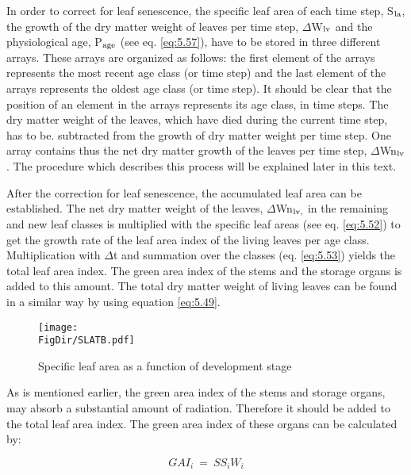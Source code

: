 In order to correct for leaf senescence, the specific leaf area of each time step, S$_{{\rm la}}$, the
growth of the dry matter weight of leaves per time step, $\Delta$W$_{{\rm lv}}$ and the physiological age,
P$_{{\rm age}}$ (see eq. \ref{eq:5.57}), have to be stored in three different arrays. These arrays are organized
as follows: the first element of the arrays represents the most recent age class (or time
step) and the last element of the arrays represents the oldest age class (or time step). It
should be clear that the position of an element in the arrays represents its age class, in
time steps. The dry matter weight of the leaves, which have died during the current time
step, has to be. subtracted from the growth of dry matter weight per time step. One array
contains thus the net dry matter growth of the leaves per time step, $\Delta$Wn$_{{\rm lv}}$. 
The procedure which describes this process will be explained later in this text. 

After the correction for leaf senescence, the accumulated leaf area can be established. The
net dry matter weight of the leaves, $\Delta$Wn$_{{\rm lv,}}$  in the remaining and new leaf classes is
multiplied with the specific leaf areas (see eq. \ref{eq:5.52}) to get the growth rate of the leaf area
index of the living leaves per age class. Multiplication with $\Delta$t and summation over the
classes (eq. \ref{eq:5.53}) yields the total leaf area index. The green area index of the stems and
the storage organs is added to this amount. The total dry matter weight of living leaves
can be found in a similar way by using equation \ref{eq:5.49}.

\begin{figure}[p]
\centering
\texttt{[image: \\FigDir/SLATB.pdf]}
\caption{Specific leaf area as a function of development stage}
\label{fig:SpecificLeafArea}
\end{figure}

As is mentioned earlier, the green area index of the stems and storage organs, may absorb
a substantial amount of radiation. Therefore it should be added to the total leaf area
index. The green area index of these organs can be calculated by:

\begin{equation}
GAI_{i} ~=~SS _{i} W _{i} 
\end{equation}

